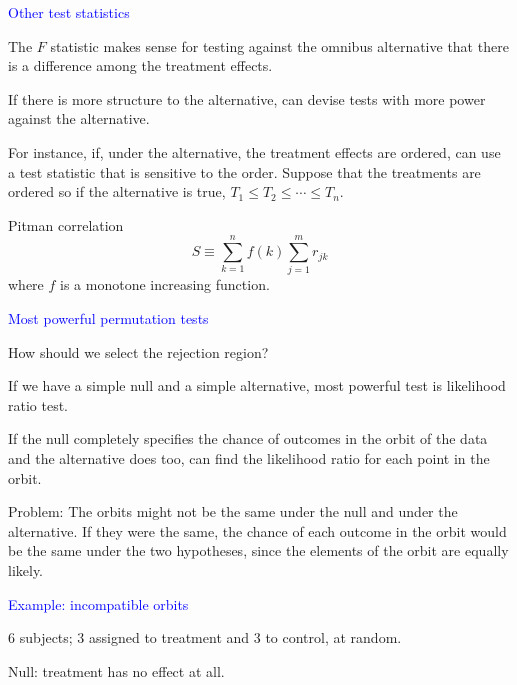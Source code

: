 \documentclass[landscape]{slides}
\newcommand{\beq}{\begin{equation}}
\newcommand{\eeq}{\end{equation}}
\begin{document}
\begin{slide}
\begin{slide}
\end{slide}

\begin{slide}
{\textcolor{blue}{Other test statistics}}

The $F$ statistic makes sense for testing against the omnibus alternative that there
is a difference among the treatment effects.

If there is more structure to the alternative, can devise tests with more
power against the alternative.

For instance, if, under the alternative, the treatment effects are ordered, can use
a test statistic that is sensitive to the order.  
Suppose that the treatments are ordered so 
if the alternative is true, $T_1 \le T_2 \le \cdots \le T_n$.

Pitman correlation
\beq
    S \equiv \sum_{k=1}^n f(k) \sum_{j=1}^{m} r_{jk}
\eeq
where $f$ is a monotone increasing function.


\end{slide}

\begin{slide}
{\textcolor{blue}{Most powerful permutation tests}}

How should we select the rejection region?

If we have a simple null and a simple alternative, most powerful test is
likelihood ratio test.

If the null completely specifies the chance of outcomes in the orbit of
the data and the alternative does too, can find the likelihood ratio for
each point in the orbit.

Problem: The orbits might not be the same under the null and under the alternative.
If they were the same, the chance of each outcome in the orbit would be
the same under the two hypotheses, since the elements of the orbit are equally
likely.

\end{slide}

\begin{slide}
{\textcolor{blue}{Example: incompatible orbits}}

6 subjects; 3 assigned to treatment and 3 to control, at random.

Null: treatment has no effect at all.


\end{slide}
\end{slide}
\end{document}
